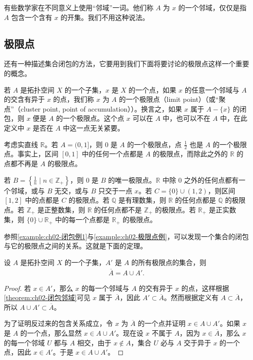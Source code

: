 \documentclass[../../main.tex]{subfiles}
\begin{document}
有些数学家在不同意义上使用“邻域”一词。他们称 $A$ 为 $x$ 的一个邻域，仅仅是指 $A$ 包含一个含有 $x$ 的开集。我们不用这种说法。

\subsection*{极限点}

还有一种描述集合闭包的方法，它要用到我们下面将要讨论的极限点这样一个重要的概念。

若 $A$ 是拓扑空间 $X$ 的一个子集，$x$ 是 $X$ 的一个点，如果 $x$ 的任意一个邻域与 $A$ 的交含有异于 $x$ 的点，我们称 $x$ 为 $A$ 的一个极限点（limit point）（或“聚点”（cluster point, point of accumulation））。换言之，如果 $x$ 属于 $A - \{x\}$ 的闭包，则 $x$ 便是 $A$ 的一个极限点。这个点 $x$ 可以在 $A$ 中，也可以不在 $A$ 中，在此定义中 $x$ 是否在 $A$ 中这一点无关紧要。

\begin{example}\label{example:ch02-极限点例}
考虑实直线 $\mathbb{R}$。若 $A = (0, 1]$，则 0 是 $A$ 的一个极限点，点 $\frac{1}{2}$ 也是 $A$ 的一个极限点。事实上，区间 $[0, 1]$ 中的任何一个点都是 $A$ 的极限点，而除此之外的 $\mathbb{R}$ 的点都不再是 $A$ 的极限点。

若 $B = \left\{\frac{1}{n} \mid n \in \mathbb{Z}_{+}\right\}$，则 0 是 $B$ 的唯一极限点。$\mathbb{R}$ 中除 0 之外的任何点都有一个邻域，或与 $B$ 无交，或与 $B$ 只交于一点 $x$。若 $C = \{0\} \cup (1, 2)$，则区间 $[1, 2]$ 中的点都是 $C$ 的极限点。若 $\mathbb{Q}$ 是有理数集，则 $\mathbb{R}$ 的任何点都是 $\mathbb{Q}$ 的极限点。若 $\mathbb{Z}_{+}$ 是正整数集，则 $\mathbb{R}$ 的任何点都不是 $\mathbb{Z}_{+}$ 的极限点。若 $\mathbb{R}_{+}$ 是正实数集，则 $\{0\} \cup \mathbb{R}_{+}$ 中的每一个点都是 $\mathbb{R}_{+}$ 的极限点。
\end{example}

参照\cref{example:ch02-闭包例1}与\cref{example:ch02-极限点例}，可以发现一个集合的闭包与它的极限点之间的关系。这就是下面的定理。

\begin{theorem}[闭包与极限点]\label{theorem:ch02-闭包极限点}
设 $A$ 是拓扑空间 $X$ 的一个子集，$A'$ 是 $A$ 的所有极限点的集合，则
\begin{align*}
\overline{A} = A \cup A'.
\end{align*}
\end{theorem}

\begin{proof}
若 $x \in A'$，那么 $x$ 的每一个邻域与 $A$ 的交有异于 $x$ 的点，这样根据\cref{theorem:ch02-闭包邻域}可见 $x$ 属于 $\overline{A}$，因此 $A' \subset \overline{A}$。然而根据定义有 $A \subset \overline{A}$，所以 $A \cup A' \subset \overline{A}$。

为了证明反过来的包含关系成立，令 $x$ 为 $\overline{A}$ 的一个点并证明 $x \in A \cup A'$。如果 $x$ 是 $A$ 的一个点，那么显然 $x \in A \cup A'$。现在设 $x$ 不属于 $A$，因为 $x \in \overline{A}$，那么 $x$ 的每一个邻域 $U$ 都与 $A$ 相交，由于 $x \notin A$，集合 $U$ 必与 $A$ 交于异于 $x$ 的一个点，因此 $x \in A'$。于是 $x \in A \cup A'$。
\end{proof}
\end{document}
